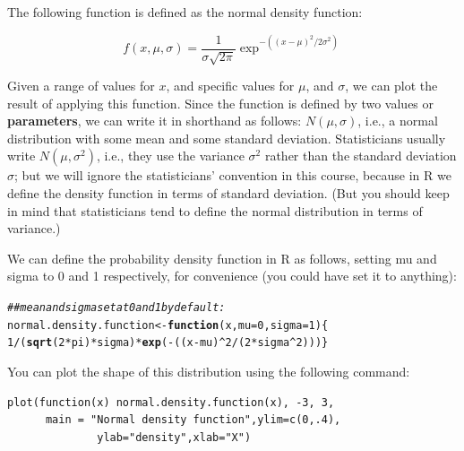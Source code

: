 \documentclass[12pt]{book}\usepackage[]{graphicx}\usepackage[]{color}
\makeatletter
\newcommand{\hlnum}[1]{\textcolor[rgb]{0.686,0.059,0.569}{#1}}%
\newcommand{\hlcom}[1]{\textcolor[rgb]{0.678,0.584,0.686}{\textit{#1}}}%
\newcommand{\hlopt}[1]{\textcolor[rgb]{0,0,0}{#1}}%
\newcommand{\hlstd}[1]{\textcolor[rgb]{0.345,0.345,0.345}{#1}}%
\newcommand{\hlkwa}[1]{\textcolor[rgb]{0.161,0.373,0.58}{\textbf{#1}}}%
\newcommand{\hlkwb}[1]{\textcolor[rgb]{0.69,0.353,0.396}{#1}}%
\newcommand{\hlkwc}[1]{\textcolor[rgb]{0.333,0.667,0.333}{#1}}%
\newcommand{\hlkwd}[1]{\textcolor[rgb]{0.737,0.353,0.396}{\textbf{#1}}}%
\newenvironment{kframe}{%
 \def\at@end@of@kframe{}%
 \ifinner\ifhmode%
  \def\at@end@of@kframe{\end{minipage}}%
  \begin{minipage}{\columnwidth}%
 \fi\fi%
 \def\FrameCommand##1{\hskip\@totalleftmargin \hskip-\fboxsep
 \colorbox{shadecolor}{##1}\hskip-\fboxsep
     \hskip-\linewidth \hskip-\@totalleftmargin \hskip\columnwidth}%
 \MakeFramed {\advance\hsize-\width
   \@totalleftmargin\z@ \linewidth\hsize
   \@setminipage}}%
 {\par\unskip\endMakeFramed%
 \at@end@of@kframe}
\newenvironment{knitrout}{}{} %
\makeatother
\begin{document}
The following function is defined as the normal density function:

\begin{equation}
f(x,\mu,\sigma) = \frac{1}{\sigma \sqrt{2 \pi}} \exp^{-((x - \mu)^2/2 \sigma^2)}
\end{equation}

Given a range of values for $x$, and specific values for $\mu$, and $\sigma$, we can
plot the result of applying this function. 
Since the function is defined by two values or \textbf{parameters}, we can write it in shorthand as follows:
$N(\mu,\sigma)$, i.e., a normal distribution with some mean and some standard deviation. Statisticians usually write $N(\mu,\sigma^2)$, i.e., they use the variance $\sigma^2$ rather than the standard deviation $\sigma$; but we will ignore the statisticians' convention in this course, because in R we define the density function in terms of standard deviation. (But you should keep in mind that statisticians tend to define the normal distribution in terms of variance.)

We can define the probability density function in R as follows, setting mu and sigma to 0 and 1 respectively, for convenience (you could have set it to anything):

\begin{knitrout}
\color{fgcolor}\begin{kframe}
\begin{alltt}
\hlcom{## mean and sigma set at 0 and 1 by default:}
\hlstd{normal.density.function} \hlkwb{<-} \hlkwa{function}\hlstd{(}\hlkwc{x}\hlstd{,}\hlkwc{mu}\hlstd{=}\hlnum{0}\hlstd{,}\hlkwc{sigma}\hlstd{=}\hlnum{1}\hlstd{)\{}
  \hlnum{1}\hlopt{/}\hlstd{(}\hlkwd{sqrt}\hlstd{(}\hlnum{2}\hlopt{*}\hlstd{pi)}\hlopt{*}\hlstd{sigma)}\hlopt{*}\hlkwd{exp}\hlstd{(}\hlopt{-}\hlstd{((x} \hlopt{-} \hlstd{mu)}\hlopt{^}\hlnum{2}\hlopt{/}\hlstd{(}\hlnum{2}\hlopt{*}\hlstd{sigma}\hlopt{^}\hlnum{2}\hlstd{)))\}}
\end{alltt}
\end{kframe}
\end{knitrout}

You can plot the shape of this distribution using the following command:

\begin{verbatim}
plot(function(x) normal.density.function(x), -3, 3,
      main = "Normal density function",ylim=c(0,.4),
              ylab="density",xlab="X")
\end{verbatim}
\end{document}
